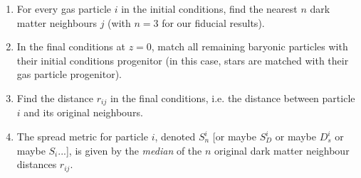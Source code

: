 \begin{enumerate} 
	\item For every gas particle $i$ in the initial conditions, find the nearest
          $n$ dark matter neighbours $j$ (with $n=3$ for our fiducial results).
	\item In the final conditions at $z=0$, match all remaining baryonic particles
	      with their initial conditions progenitor (in this case, stars are
	      matched with their gas particle progenitor).
	\item Find the distance $r_{ij}$ in the final conditions, i.e. the distance between particle $i$ and its original neighbours. 
	\item The spread metric for particle $i$, denoted $S_{n}^{i}$ [or maybe $S_{D}^i$ or maybe $D_{s}^i$ or maybe $S_i$...], is given by the \emph{median} of the $n$
	      original dark matter neighbour distances $r_{ij}$.
\end{enumerate}

